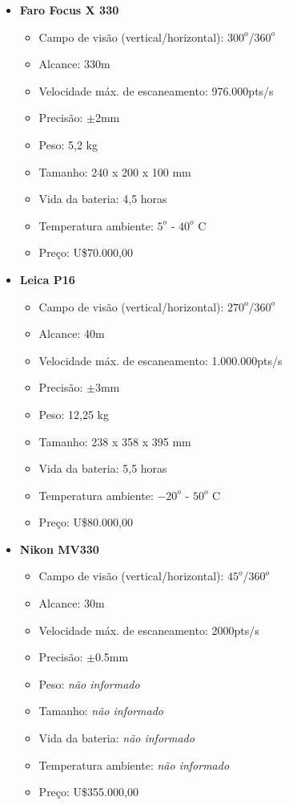 \begin{itemize}
  \item \textbf{Faro Focus X 330}
  	\begin{itemize}
  		\item Campo de visão (vertical/horizontal): $300^o$/$360^o$
  		\item Alcance: 330m
  		\item Velocidade máx. de escaneamento: 976.000pts/s
  		\item Precisão: $\pm$2mm
  		\item Peso: 5,2 kg
  		\item Tamanho: 240 x 200 x 100 mm
  		\item Vida da bateria: 4,5 horas
  		\item Temperatura ambiente: $5^o$ - $40^o$ C
  		\item Preço: U\$70.000,00
	\end{itemize}
  \item \textbf{Leica P16}
  	\begin{itemize}
  		\item Campo de visão (vertical/horizontal): $270^o$/$360^o$
  		\item Alcance: 40m
  		\item Velocidade máx. de escaneamento: 1.000.000pts/s
  		\item Precisão: $\pm$3mm
  		\item Peso: 12,25 kg
  		\item Tamanho: 238 x 358 x 395 mm
  		\item Vida da bateria: 5,5 horas
  		\item Temperatura ambiente: $-20^o$ - $50^o$ C
  		\item Preço: U\$80.000,00
	\end{itemize}
   \item \textbf{Nikon MV330}
  	\begin{itemize}
  		\item Campo de visão (vertical/horizontal): $45^o$/$360^o$
  		\item Alcance: 30m
  		\item Velocidade máx. de escaneamento: 2000pts/s
  		\item Precisão: $\pm$0.5mm
  		\item Peso: \textit{não informado}
  		\item Tamanho: \textit{não informado}
  		\item Vida da bateria: \textit{não informado}
  		\item Temperatura ambiente: \textit{não informado}
  		\item Preço: U\$355.000,00
	\end{itemize}


\end{itemize}


